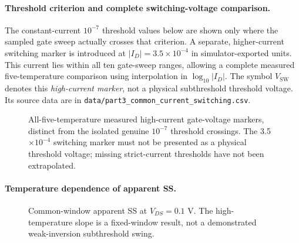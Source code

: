 \paragraph{Threshold criterion and complete switching-voltage comparison.}
The constant-current $10^{-7}$ threshold values below are shown
only where the sampled gate sweep actually crosses that criterion.
A separate, higher-current switching marker is introduced at
$|I_D|=3.5\times10^{-4}$ in simulator-exported units.
This current lies within all ten gate-sweep ranges, allowing
a complete measured five-temperature comparison using interpolation
in $\log_{10}|I_D|$. The symbol $V_{\mathrm{SW}}$ denotes this
\emph{high-current marker}, not a physical subthreshold threshold
voltage. Its source data are in
\texttt{data/part3\_common\_current\_switching.csv}.

\begin{figure}[H]\centering
{}
\caption{All-five-temperature measured high-current
gate-voltage markers, distinct from the isolated genuine
$10^{-7}$ threshold crossings. The 3.5$\times10^{-4}$
switching marker must not be presented as a physical
threshold voltage; missing strict-current thresholds
have not been extrapolated.}
\end{figure}

\paragraph{Temperature dependence of apparent SS.}
\begin{figure}[H]\centering
{}
\caption{Common-window apparent SS at $V_{DS}=0.1$ V.
The high-temperature slope is a fixed-window result, not a demonstrated
weak-inversion subthreshold swing.}
\end{figure}


